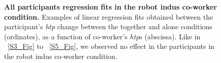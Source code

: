 \begin{figure}
	\caption{{\bf All participants regression fits in the robot indus co-worker condition.} Examples of linear regression fits obtained between the participant's {\it htp} change between the together and alone conditions (ordinates), as a function of co-worker's {\it htp}s (abscissa). Like in ~\ref{S3_Fig} to ~\ref{S5_Fig},  we observed no effect in the participants in the robot indus co-worker condition.}
	\label{S6_Fig}
\end{figure}
